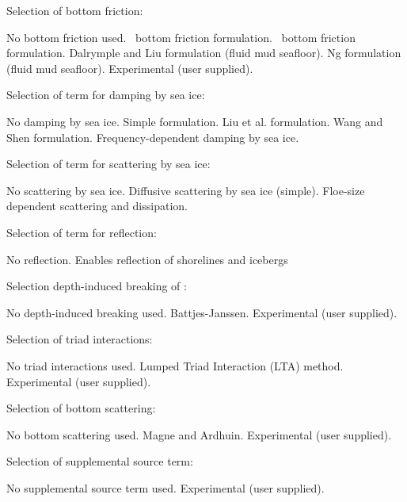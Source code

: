 \noindent
Selection of bottom friction:
\begin{slist}
 {No bottom friction used.}
 {\js\ bottom friction formulation.}
 {\showex\ bottom friction formulation.}
 {Dalrymple and Liu formulation (fluid mud seafloor).}
 {Ng formulation (fluid mud seafloor).}
 {Experimental (user supplied).}
\end{slist}

\noindent
Selection of term for damping by sea ice:
\begin{slist}
 {No damping by sea ice.}
 {Simple formulation.}
 {Liu et al. formulation.}
 {Wang and Shen formulation.}
 {Frequency-dependent damping by sea ice.}
\end{slist}

\noindent
Selection of term for scattering by sea ice:
\begin{slist}
 {No scattering by sea ice.}
 {Diffusive scattering by sea ice (simple).}
 {Floe-size dependent scattering and dissipation.}
\end{slist}

\noindent
Selection of term for reflection:
\begin{slist}
 {No reflection.}
 {Enables reflection of shorelines and icebergs}
\end{slist}

\noindent
Selection depth-induced breaking of :
\begin{slist}
 {No depth-induced breaking used.}
 {Battjes-Janssen.}
 {Experimental (user supplied).}
\end{slist}

\noindent
Selection of triad interactions:
\begin{slist}
 {No triad interactions used.}
 {Lumped Triad Interaction (LTA) method.}
 {Experimental (user supplied).}
\end{slist}

\noindent
Selection of bottom scattering:
\begin{slist}
 {No bottom scattering used.}
 {Magne and Ardhuin.}
 {Experimental (user supplied).}
\end{slist}

\noindent
Selection of supplemental source term:
\begin{slist}
 {No supplemental source term used.}
 {Experimental (user supplied).}
\end{slist}

